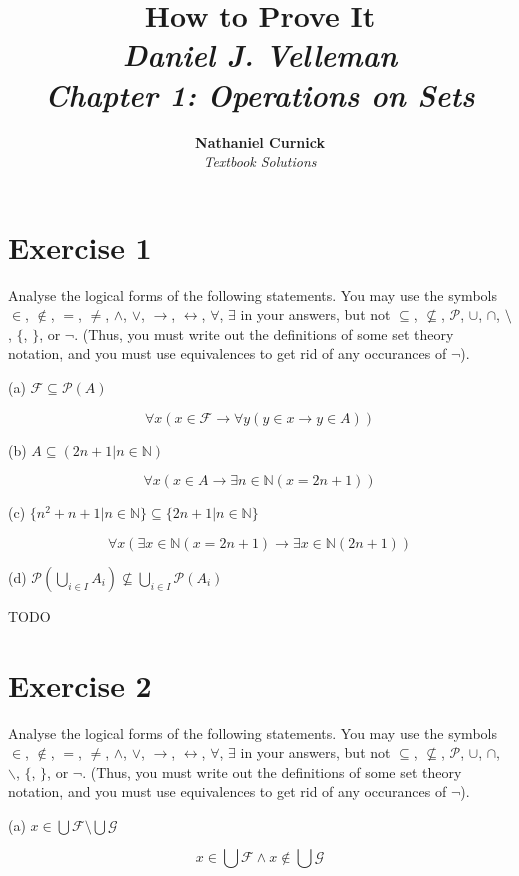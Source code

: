 \documentclass[11pt]{article}
\title{\textbf{How to Prove It} \\ {\Large\itshape Daniel J. Velleman} \\ {\Large\itshape Chapter 1: Operations on Sets}}
\author{\textbf{Nathaniel Curnick} \\ \textit{Textbook Solutions}}
\date{}
\newcommand{\then}{\rightarrow}
\newcommand{\bicond}{\leftrightarrow}
\newcommand{\powerset}[1]{\mathscr{P}(#1)}
\newcommand{\family}{\mathcal{F}}
\begin{document}
\maketitle

\section*{Exercise 1}

Analyse the logical forms of the following statements. You may use the symbols
$\in$, $\notin$, $=$, $\neq$, $\wedge$, $\vee$, $\then$, $\bicond$, $\forall$,
$\exists$ in your answers, but not $\subseteq$, $\nsubseteq$, $\mathscr{P}$, 
$\cup$, $\cap$, $\setminus$, $\{$, $\}$, or $\neg$. (Thus, you must write out the
definitions of some set theory notation, and you must use equivalences to get 
rid of any occurances of $\neg$).

\noindent (a) $\family \subseteq \powerset{A}$

$$\forall x (x \in \family \then \forall y (y \in x \then y \in A))$$

\noindent (b) $A \subseteq (2n + 1 | n \in \mathbb{N})$

$$\forall x (x \in A \then \exists n \in \mathbb{N} (x = 2n + 1))$$

\noindent (c) $\{n^2 + n + 1 | n \in \mathbb{N}\} \subseteq 
\{2n + 1 | n \in \mathbb{N}\}$

$$\forall x (\exists x \in \mathbb{N} (x = 2n + 1) 
\then \exists x \in \mathbb{N} (2n + 1))$$

\noindent (d) $\powerset{\bigcup_{i \in I} A_i} \nsubseteq 
\bigcup_{i \in I} \powerset{A_i}$

TODO

\section*{Exercise 2}

Analyse the logical forms of the following statements. You may use the symbols
$\in$, $\notin$, $=$, $\neq$, $\wedge$, $\vee$, $\then$, $\bicond$, $\forall$,
$\exists$ in your answers, but not $\subseteq$, $\nsubseteq$, $\mathscr{P}$, 
$\cup$, $\cap$, $\backslash$, $\{$, $\}$, or $\neg$. (Thus, you must write out the
definitions of some set theory notation, and you must use equivalences to get 
rid of any occurances of $\neg$).

\noindent (a) $x \in \bigcup \family \setminus \bigcup \mathcal{G}$

$$x \in \bigcup \family \wedge x \notin \bigcup \mathcal{G}$$
\end{document}
